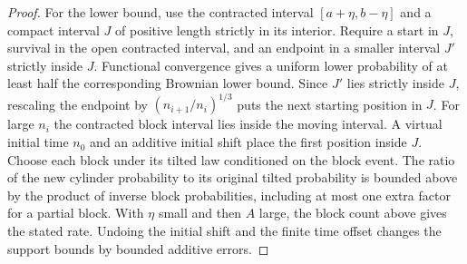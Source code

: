 \documentclass[11pt]{article}
\theoremstyle{definition}
\theoremstyle{remark}
\begin{document}
\begin{proof}
For the lower bound, use the contracted interval
$[a+\eta,b-\eta]$ and a compact interval $J$ of positive length
strictly in its interior. Require a start in $J$, survival in
the open contracted interval, and an endpoint in a smaller
interval $J'$ strictly inside $J$.
Functional convergence gives a uniform lower probability of
at least half the corresponding Brownian lower bound.
Since $J'$ lies strictly inside $J$, rescaling the endpoint
by $(n_{i+1}/n_i)^{1/3}$ puts the next starting position in $J$.
For large $n_i$ the contracted block interval lies inside
the moving interval. A virtual initial time $n_0$ and an
additive initial shift place the first position inside $J$.
Choose each block under its tilted law conditioned on the
block event. The ratio of the new cylinder probability to
its original tilted probability is bounded above by the
product of inverse block probabilities, including at most
one extra factor for a partial block. With $\eta$ small
and then $A$ large, the block count above gives the stated
rate. Undoing the initial shift and the finite time offset
changes the support bounds by bounded additive errors.
\end{proof}
\end{document}

